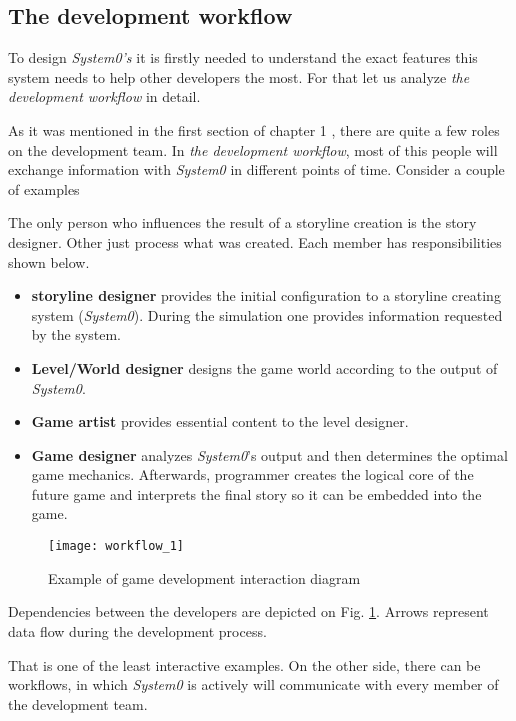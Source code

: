 \subsection{The development workflow}
To design \textit{System0's} it is firstly needed to understand the exact features this system needs to help other developers the most. For that let us analyze \textit{the development workflow} in detail.\par
As it was mentioned in the first section of chapter 1 , there are quite a few roles on the development team.
In \textit{the development workflow}, most of this people will exchange information with \textit{System0} in different points of time. Consider a couple of examples
\begin{example}
The only person who influences the result of a storyline creation is the story designer.  Other just process what was created. Each member has responsibilities shown below.
\begin{itemize}
 \item \textbf{storyline designer} provides the initial configuration to a storyline creating system (\textit{System0}). During the simulation one provides information requested by the system.
 \item \textbf{Level/World designer} designs the game world according to the output of \textit{System0}.
 \item \textbf{Game artist} provides essential content to the level designer.
 \item \textbf{Game designer} analyzes \textit{System0}'s output and then determines the optimal game mechanics. Afterwards, programmer creates the logical core of the future game and interprets the final story so it can be embedded into the game.
\end{itemize}
    \begin{figure}[h!]
     \begin{center}
      \texttt{[image: workflow\_1]}
      \caption{Example of game development interaction diagram }
      \label{SimpleWorkflow}
     \end{center}
    \end{figure}
Dependencies between the developers are depicted on Fig. \ref{SimpleWorkflow}. Arrows represent data flow during the development process.
\end{example}

That is one of the least interactive examples. On the other side, there can be workflows, in which \textit{System0} is actively will communicate with every member of the development team.

